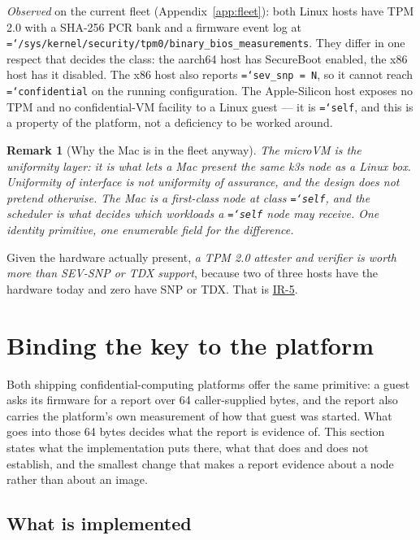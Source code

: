 \documentclass[11pt,a4paper]{article}
\newtheorem{remark}[definition]{Remark}
\newcommand{\code}[1]{\texttt{\hyphenchar\font=`\-\relax #1}}
\begin{document}
\emph{Observed} on the current fleet (Appendix~\ref{app:fleet}): both Linux hosts
have TPM 2.0 with a SHA-256 PCR bank and a firmware event log at
\code{/sys/kernel/security/tpm0/binary\_bios\_measurements}. They differ in one
respect that decides the class: the aarch64 host has SecureBoot enabled, the x86
host has it disabled. The x86 host also reports \code{sev\_snp = N}, so it cannot
reach \code{confidential} on the running configuration. The Apple-Silicon host
exposes no TPM and no confidential-VM facility to a Linux guest --- it is
\code{self}, and this is a property of the platform, not a deficiency to be worked
around.

\begin{remark}[Why the Mac is in the fleet anyway]
The microVM is the uniformity layer: it is what lets a Mac present the same k3s
node as a Linux box. Uniformity of \emph{interface} is not uniformity of
\emph{assurance}, and the design does not pretend otherwise. The Mac is a
first-class node at class \code{self}, and the scheduler is what decides which
workloads a \code{self} node may receive. One identity primitive, one enumerable
field for the difference.
\end{remark}

Given the hardware actually present, \emph{a TPM 2.0 attester and verifier is
worth more than SEV-SNP or TDX support}, because two of three hosts have the
hardware today and zero have SNP or TDX. That is \hyperref[sec:req]{IR-5}.

\section{Binding the key to the platform}
\label{sec:bind}

Both shipping confidential-computing platforms offer the same primitive: a guest
asks its firmware for a report over 64 caller-supplied bytes, and the report also
carries the platform's own measurement of how that guest was started. What goes
into those 64 bytes decides what the report is evidence of. This section states
what the implementation puts there, what that does and does not establish, and the
smallest change that makes a report evidence about a node rather than about an
image.

\subsection{What is implemented}
\end{document}
